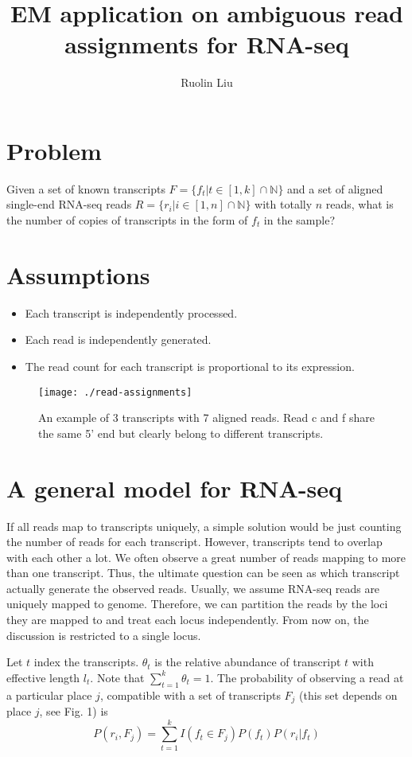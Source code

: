 \documentclass[12pt]{article}
\title{EM application on ambiguous read assignments for RNA-seq }
\author{Ruolin Liu}
\newcommand{\natN}{\mathbb{N}}
\begin{document}
\maketitle

\section{Problem}
Given a set of known transcripts $F = \{f_t|t\in[1, k] \cap \natN \}$ and a set of aligned single-end RNA-seq reads $R = \{r_i|i\in [1,n]  \cap \natN \}$ with totally $n$ reads, what is the number of copies of transcripts in the form of $f_t$ in the sample?

\section{Assumptions}
\begin{itemize}
\item Each transcript is independently processed.
\item Each read is independently generated.
\item The read count for each transcript is proportional to its expression.  
\end{itemize} 

\begin{figure}[H]
\centering
\texttt{[image: ./read-assignments]}
\caption{An example of 3 transcripts with 7 aligned reads. Read c and f share the same 5' end but clearly belong to different transcripts.}
\label{fig:read-assignments}
\end{figure}

\section{A general model for RNA-seq}
If all reads map to transcripts uniquely, a simple solution would be just counting the number of reads for each transcript. However, transcripts tend to overlap with each other a lot. We often observe a great number of reads mapping to more than one transcript. Thus, the ultimate question can be seen as which transcript actually generate the observed reads. Usually, we assume RNA-seq reads are uniquely mapped to genome. Therefore, we can partition the reads by the loci they are mapped to and treat each locus independently. From now on, the discussion is restricted to a single locus.


Let $t$ index the transcripts. $\theta_t$ is the relative abundance of transcript $t$ with effective length  $l_t$. Note that $\sum_{t=1}^{k}\theta_t=1$. The probability of observing a read at a particular place $j$, compatible with a set of transcripts $F_j$ (this set depends on place $j$, see Fig. 1) is 
\begin{equation}
P(r_i, F_j) = \sum_{t=1}^{k}I(f_t \in F_j)P(f_t)P(r_i|f_t)
\end{equation}
\end{document}
